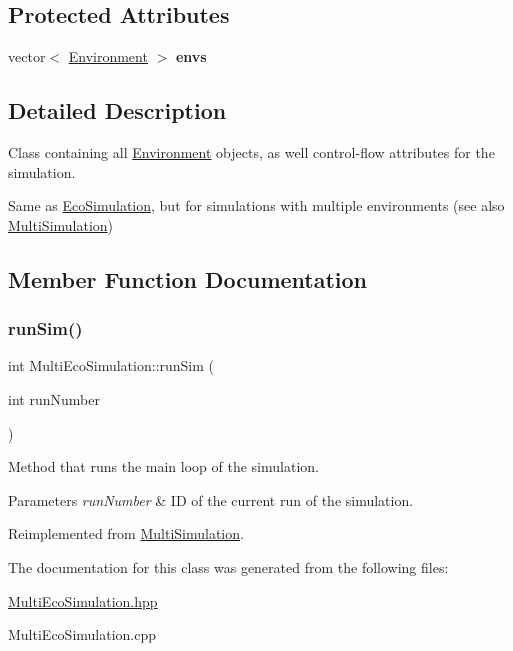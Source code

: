 \subsection*{Protected Attributes}
\begin{DoxyCompactItemize}
\item 
\hypertarget{classMultiEcoSimulation_ad3c5ac5fa8139145d797d0f47653838e}{}\label{classMultiEcoSimulation_ad3c5ac5fa8139145d797d0f47653838e} 
vector$<$ \hyperlink{classEnvironment}{Environment} $>$ {\bfseries envs}
\end{DoxyCompactItemize}


\subsection{Detailed Description}
Class containing all \hyperlink{classEnvironment}{Environment} objects, as well control-\/flow attributes for the simulation. 

Same as \hyperlink{classEcoSimulation}{Eco\+Simulation}, but for simulations with multiple environments (see also \hyperlink{classMultiSimulation}{Multi\+Simulation}) 

\subsection{Member Function Documentation}
\hypertarget{classMultiEcoSimulation_ad490e089c083d06d80c62af9e1564ac3}{}\label{classMultiEcoSimulation_ad490e089c083d06d80c62af9e1564ac3} 
\subsubsection{\texorpdfstring{run\+Sim()}{runSim()}}
{\footnotesize\ttfamily int Multi\+Eco\+Simulation\+::run\+Sim (\begin{DoxyParamCaption}\item[{int}]{run\+Number }\end{DoxyParamCaption})\hspace{0.3cm}{\ttfamily [virtual]}}



Method that runs the main loop of the simulation. 


\begin{DoxyParams}{Parameters}
{\em run\+Number} & ID of the current run of the simulation. \\
\hline
\end{DoxyParams}


Reimplemented from \hyperlink{classMultiSimulation_a235347d04fd0c7e1a2e35d7a39e77583}{Multi\+Simulation}.



The documentation for this class was generated from the following files\+:\begin{DoxyCompactItemize}
\item 
\hyperlink{MultiEcoSimulation_8hpp}{Multi\+Eco\+Simulation.\+hpp}\item 
Multi\+Eco\+Simulation.\+cpp\end{DoxyCompactItemize}
